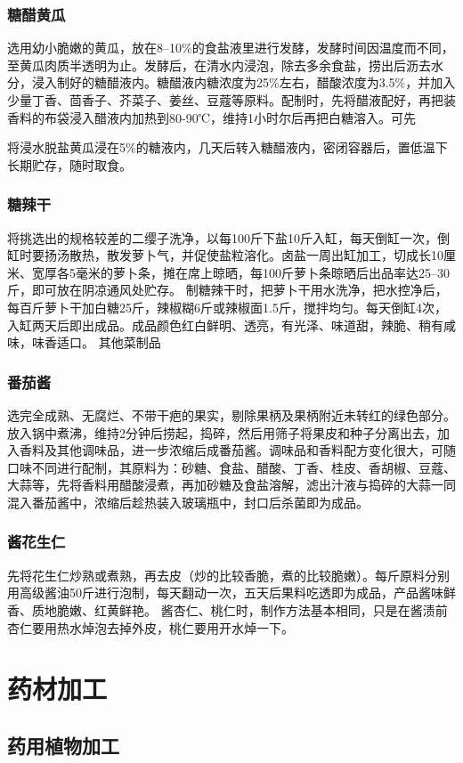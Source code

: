 \documentclass{ctexbook}
\begin{document}
\subsection{糖醋黄瓜}
选用幼小脆嫩的黄瓜，放在8--10\%的食盐液里进行发酵，发酵时间因温度而不同，至黄瓜肉质半透明为止。发酵后，在清水内浸泡，除去多余食盐，捞出后沥去水分，浸入制好的糖醋液内。糖醋液内糖浓度为25\%左右，醋酸浓度为3.5\%，并加入少量丁香、茴香子、芥菜子、姜丝、豆蔻等原料。配制时，先将醋液配好，再把装香料的布袋浸入醋液内加热到80-90℃，维持1小时尔后再把白糖溶入。可先

将浸水脱盐黄瓜浸在5\%的糖液内，几天后转入糖醋液内，密闭容器后，置低温下长期贮存，随时取食。
\subsection{糖辣干}
将挑选出的规格较差的二缨子洗净，以每100斤下盐10斤入缸，每天倒缸一次，倒缸时要扬汤散热，散发萝卜气，并促使盐粒溶化。卤盐一周出缸加工，切成长10厘米、宽厚各5毫米的萝卜条，摊在席上晾晒，每100斤萝卜条晾晒后出品率达25--30斤，即可放在阴凉通风处贮存。
制糖辣干时，把萝卜干用水洗净，把水控净后，每百斤萝卜干加白糖25斤，辣椒糊6斤或辣椒面1.5斤，搅拌均匀。每天倒缸4次，入缸两天后即出成品。成品颜色红白鲜明、透亮，有光泽、味道甜，辣脆、稍有咸味，味香适口。
其他菜制品
\subsection{番茄酱}
选完全成熟、无腐烂、不带干疤的果实，剔除果柄及果柄附近未转红的绿色部分。放入锅中煮沸，维持2分钟后捞起，捣碎，然后用筛子将果皮和种子分离出去，加入香料及其他调味品，进一步浓缩后成番茄酱。调味品和香料配方变化很大，可随口味不同进行配制，其原料为：砂糖、食盐、醋酸、丁香、桂皮、香胡椒、豆蔻、大蒜等，先将香料用醋酸浸煮，再加砂糖及食盐溶解，滤出汁液与捣碎的大蒜一同混入番茄酱中，浓缩后趁热装入玻璃瓶中，封口后杀菌即为成品。
\subsection{酱花生仁}
先将花生仁炒熟或煮熟，再去皮（炒的比较香脆，煮的比较脆嫩）。每斤原料分别用高级酱油50斤进行泡制，每天翻动一次，五天后果料吃透即为成品，产品酱味鲜香、质地脆嫩、红黄鲜艳。
酱杏仁、桃仁时，制作方法基本相同，只是在酱渍前杏仁要用热水焯泡去掉外皮，桃仁要用开水焯一下。
\chapter{药材加工}
\section{药用植物加工}
\end{document}
